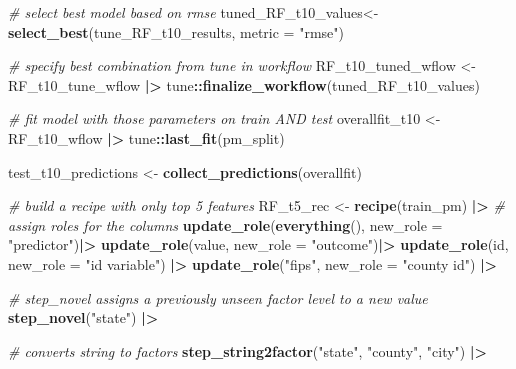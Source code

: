 \documentclass[
]{article}
\newenvironment{Shaded}{\begin{snugshade}}{\end{snugshade}}
\newcommand{\AttributeTok}[1]{\textcolor[rgb]{0.13,0.29,0.53}{#1}}
\newcommand{\CommentTok}[1]{\textcolor[rgb]{0.56,0.35,0.01}{\textit{#1}}}
\newcommand{\FunctionTok}[1]{\textcolor[rgb]{0.13,0.29,0.53}{\textbf{#1}}}
\newcommand{\NormalTok}[1]{#1}
\newcommand{\OtherTok}[1]{\textcolor[rgb]{0.56,0.35,0.01}{#1}}
\newcommand{\SpecialCharTok}[1]{\textcolor[rgb]{0.81,0.36,0.00}{\textbf{#1}}}
\newcommand{\StringTok}[1]{\textcolor[rgb]{0.31,0.60,0.02}{#1}}
\begin{document}
\begin{Shaded}
\begin{Highlighting}[]
\CommentTok{\# select best model based on rmse}
\NormalTok{tuned\_RF\_t10\_values}\OtherTok{\textless{}{-}} \FunctionTok{select\_best}\NormalTok{(tune\_RF\_t10\_results, }\AttributeTok{metric =} \StringTok{"rmse"}\NormalTok{)}

\CommentTok{\# specify best combination from tune in workflow}
\NormalTok{RF\_t10\_tuned\_wflow }\OtherTok{\textless{}{-}}\NormalTok{RF\_t10\_tune\_wflow }\SpecialCharTok{|\textgreater{}}
\NormalTok{  tune}\SpecialCharTok{::}\FunctionTok{finalize\_workflow}\NormalTok{(tuned\_RF\_t10\_values)}

\CommentTok{\# fit model with those parameters on train AND test}
\NormalTok{overallfit\_t10 }\OtherTok{\textless{}{-}}\NormalTok{ RF\_t10\_wflow }\SpecialCharTok{|\textgreater{}}
\NormalTok{  tune}\SpecialCharTok{::}\FunctionTok{last\_fit}\NormalTok{(pm\_split)}

\NormalTok{test\_t10\_predictions }\OtherTok{\textless{}{-}} \FunctionTok{collect\_predictions}\NormalTok{(overallfit)}

\CommentTok{\# build a recipe with only top 5 features}
\NormalTok{RF\_t5\_rec }\OtherTok{\textless{}{-}} \FunctionTok{recipe}\NormalTok{(train\_pm) }\SpecialCharTok{|\textgreater{}}
    \CommentTok{\# assign roles for the columns}
    \FunctionTok{update\_role}\NormalTok{(}\FunctionTok{everything}\NormalTok{(), }\AttributeTok{new\_role =} \StringTok{"predictor"}\NormalTok{)}\SpecialCharTok{|\textgreater{}}
    \FunctionTok{update\_role}\NormalTok{(value, }\AttributeTok{new\_role =} \StringTok{"outcome"}\NormalTok{)}\SpecialCharTok{|\textgreater{}}
    \FunctionTok{update\_role}\NormalTok{(id, }\AttributeTok{new\_role =} \StringTok{"id variable"}\NormalTok{) }\SpecialCharTok{|\textgreater{}}
    \FunctionTok{update\_role}\NormalTok{(}\StringTok{"fips"}\NormalTok{, }\AttributeTok{new\_role =} \StringTok{"county id"}\NormalTok{) }\SpecialCharTok{|\textgreater{}}
    
    \CommentTok{\# step\_novel assigns a previously unseen factor level to a new value }
    \FunctionTok{step\_novel}\NormalTok{(}\StringTok{"state"}\NormalTok{) }\SpecialCharTok{|\textgreater{}}
    
    \CommentTok{\# converts string to factors}
    \FunctionTok{step\_string2factor}\NormalTok{(}\StringTok{"state"}\NormalTok{, }\StringTok{"county"}\NormalTok{, }\StringTok{"city"}\NormalTok{) }\SpecialCharTok{|\textgreater{}}
  

\end{Highlighting}
\end{Shaded}
\end{document}

